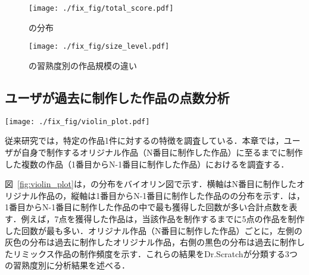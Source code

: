 \documentclass[submit]{ipsj}
\begin{document}
\begin{figure}[t]
    \centering
    \texttt{[image: ./fix\_fig/total\_score.pdf]}
    \caption{\textcolor{red}{}の分布}
    \label{fig:total_score}
\end{figure}

\begin{figure}[t]
    \centering
    \texttt{[image: ./fix\_fig/size\_level.pdf]}
    \caption{\textcolor{red}{}の習熟度別の作品規模の違い}
    \label{fig:size_level}
\end{figure}

\subsection{ユーザが過去に制作した作品の点数分析}

\begin{figure*}[t]
	\centering
	\texttt{[image: ./fix\_fig/violin\_plot.pdf]}
    \caption{\textcolor{red}{}}
    \label{fig:violin_plot}
\end{figure*}

従来研究では，特定の作品1件に対する\textcolor{red}{}の特徴を調査している．本章では，ユーザが自身で制作するオリジナル作品（N番目に制作した作品）に至るまでに制作した複数の作品（1番目からN-1番目に制作した作品）における\textcolor{red}{}を調査する．

図~\ref{fig:violin_plot}は，\textcolor{red}{}の分布をバイオリン図で示す．横軸はN番目に制作したオリジナル作品の\textcolor{red}{}，縦軸は1番目からN-1番目に制作した作品の\textcolor{red}{}の分布を示す．\textcolor{red}{}は，1番目からN-1番目に制作した作品の中で最も獲得した回数が多い合計点数を表す．例えば，7点を獲得した作品は，当該作品を制作するまでに5点の作品を制作した回数が最も多い．オリジナル作品（N番目に制作した作品）ごとに，左側の灰色の分布は過去に制作したオリジナル作品，右側の黒色の分布は過去に制作したリミックス作品の制作頻度を示す．これらの結果をDr.Scratchが分類する3つの習熟度別に分析結果を述べる．
\end{document}
